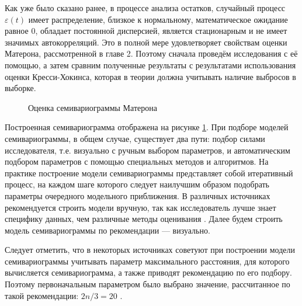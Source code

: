 Как уже было сказано ранее, в процессе анализа остатков, случайный процесс $ \varepsilon(t) $ имеет распределение, близкое к нормальному, математическое ожидание равное $ 0 $, обладает постоянной дисперсией, является стационарным и не имеет значимых автокорреляций. Это в полной мере удовлетворяет свойствам оценки Матерона, рассмотренной в главе 2. Поэтому сначала проведём исследования с её помощью, а затем сравним полученные результаты с результатами использования оценки Кресси-Хокинса, которая в теории должна учитывать наличие выбросов в выборке.

\begin{figure}[ht]
\caption{Оценка семивариограммы Матерона}
\label{img:variogram}
\end{figure}

Построенная семивариограмма отображена на рисунке \ref{img:variogram}. При подборе моделей семивариограммы, в общем случае, существует два пути: подбор силами исследователя, т.е. визуально с ручным выбором параметров, и автоматическим подбором параметров с помощью специальных методов и алгоритмов. На практике построение модели семивариограммы представляет собой итеративный процесс, на каждом шаге которого следует наилучшим образом подобрать параметры очередного модельного приближения. В различных источниках рекомендуется строить модели вручную, так как исследователь лучше знает специфику данных, чем различные методы оценивания \cite{geostat2010}. Далее будем строить модель семивариограммы по рекомендации --- визуально.

Следует отметить, что в некоторых источниках советуют при построении модели семивариограммы учитывать параметр максимального расстояния, для которого вычисляется семивариограмма, а также приводят рекомендацию по его подбору. Поэтому первоначальным параметром было выбрано значение, рассчитанное по такой рекомендации: $ 2n / 3 = 20 $ \cite{cressie2011statistics}.

